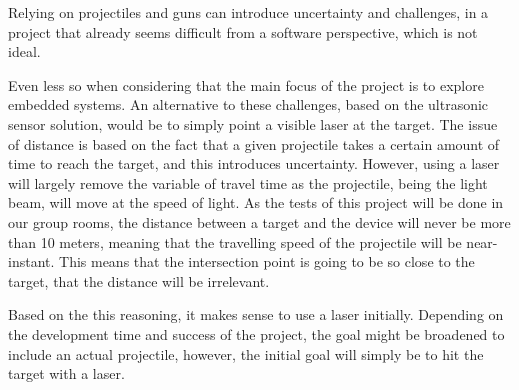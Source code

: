 Relying on projectiles and guns can introduce uncertainty and challenges, in a project that already seems difficult from a software perspective, which is not ideal.

Even less so when considering that the main focus of the project is to explore embedded systems.
An alternative to these challenges, based on the ultrasonic sensor solution, would be to simply point a visible laser at the target.
The issue of distance is based on the fact that a given projectile takes a certain amount of time to reach the target, and this introduces uncertainty. 
However, using a laser will largely remove the variable of travel time as the projectile, being the light beam, will move at the speed of light.
As the tests of this project will be done in our group rooms, the distance between a target and the device will never be more than 10 meters, meaning that the travelling speed of the projectile will be near-instant. 
This means that the intersection point is going to be so close to the target, that the distance will be irrelevant.


Based on the this reasoning, it makes sense to use a laser initially.
Depending on the development time and success of the project, the goal might be broadened to include an actual projectile, however, the initial goal will simply be to hit the target with a laser.
